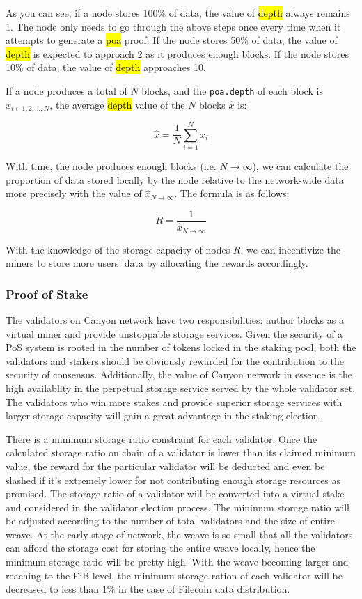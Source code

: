 \documentclass[]{article}
\newcommand{\code}[1]{{%
  \sethlcolor{inlineBG}%
  \color{inlineFG}%
  \ttfamily
  \hl{ #1 }%
}}
\newcounter{subsubsubsection}[subsubsection]
\begin{document}
As you can see, if a node stores 100\% of data, the value of \code{depth} always remains 1. The node only needs to go through the above steps once every time when it attempts to generate a \code{poa} proof. If the node stores 50\% of data, the value of \code{depth} is expected to approach 2 as it produces enough blocks. If the node stores 10\% of data, the value of \code{depth} approaches 10.

If a node produces a total of $N$ blocks, and the \texttt{poa.depth} of each block is $x_{i\in 1,2,...,N}$, the average \code{depth} value of the $N$ blocks $\hat{x}$ is:

$$
\hat{x} = \frac{1}{N} {\sum_{i=1}^N x_i}
$$

With time, the node produces enough blocks (i.e. $N \to \infty$), we can calculate the proportion of data stored locally by the node relative to the network-wide data more precisely with the value of $\hat{x}_{N \to \infty}$. The formula is as follows:

$$
R = \frac{1}{\hat{x}_{{N \to \infty}}}
$$

With the knowledge of the storage capacity of nodes $R$, we can incentivize the miners to store more users' data by allocating the rewards accordingly.

\subsubsection{Proof of Stake}


The validators on Canyon network have two responsibilities: author blocks as a virtual miner and provide unstoppable storage services. Given the security of a PoS system is rooted in the number of tokens locked in the staking pool, both the validators and stakers should be obviously rewarded for the contribution to the security of consensus. Additionally, the value of Canyon network in essence is the high availablity in the perpetual storage service served by the whole validator set. The validators who win more stakes and provide superior storage services with larger storage capacity will gain a great advantage in the staking election.

There is a minimum storage ratio constraint for each validator. Once the calculated storage ratio on chain of a validator is lower than its claimed minimum value, the reward for the particular validator will be deducted and even be slashed if it's extremely lower for not contributing enough storage resources as promised. The storage ratio of a validator will be converted into a virtual stake and considered in the validator election process. The minimum storage ratio will be adjusted according to the number of total validators and the size of entire weave. At the early stage of network, the weave is so small that all the validators can afford the storage cost for storing the entire weave locally, hence the minimum storage ratio will be pretty high. With the weave becoming larger and reaching to the EiB level, the minimum storage ration of each validator will be decreased to less than 1\% in the case of Filecoin data distribution.
\end{document}

